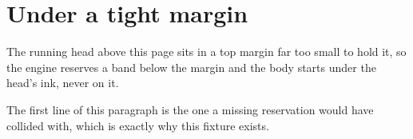 \documentclass{article}
\begin{document}
\section{Under a tight margin}

The running head above this page sits in a top margin far too small to
hold it, so the engine reserves a band below the margin and the body
starts under the head's ink, never on it.

The first line of this paragraph is the one a missing reservation would
have collided with, which is exactly why this fixture exists.
\end{document}
